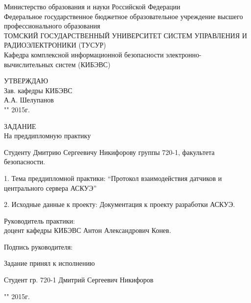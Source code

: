 \newpage
{}

\begin{center}
Министерство образования и науки Российской Федерации\\
Федеральное государственное бюджетное образовательное учреждение высшего профессионального образования\\
ТОМСКИЙ ГОСУДАРСТВЕННЫЙ УНИВЕРСИТЕТ СИСТЕМ УПРАВЛЕНИЯ И РАДИОЭЛЕКТРОНИКИ (ТУСУР)\\
Кафедра комплексной информационной безопасности электронно-вычислительных систем (КИБЭВС)\\
\end{center}

\begin{flushright}
 \begin{minipage}{0.4\textwidth}
  УТВЕРЖДАЮ \\
  Зав. кафедры КИБЭВС \\
  \underline{\hspace{2.5cm}}А.А. Шелупанов \\
  "\underline{\hspace{1cm}}"\underline{\hspace{3cm}} 2015г.
 \end{minipage}
\end{flushright}

\vspace{2cm}

\begin{center}
 ЗАДАНИЕ \\
 На преддипломную практику
\end{center}

Студенту Дмитрию Сергеевичу Никифорову группы 720-1, факультета безопасности.

1. Тема преддипломной практики: ``Протокол взаимодействия датчиков и центрального сервера АСКУЭ''

2. Исходные данные к проекту: Документация к проекту разработки АСКУЭ.

Руководитель практики: \\ доцент кафедры КИБЭВС Антон Александрович Конев.

\hfill Подпись руководителя: \underline{\hspace{2.5cm}}

Задание принял к исполнению

Студент гр. 720-1 Дмитрий Сергеевич Никифоров \hfill \underline{\hspace{2.5cm}}

\hfill "\underline{\hspace{1cm}}"\underline{\hspace{3cm}} 2015г.